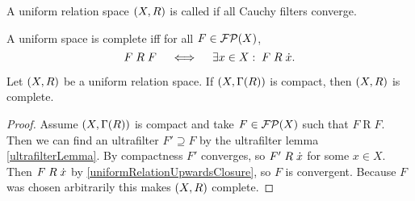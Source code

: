 \begin{definition}
A uniform relation space $\sSet{X,R}$ is called  if all Cauchy filters converge.
\end{definition}

A uniform space is complete iff for all $F\in\operatorname{\mathcal{FP}}(X)$,
\[ F\mathrel{R}F \quad\iff\quad \exists x\in X:\; F\mathrel{R}\dot{x}. \]

\begin{proposition} \label{compactImpliesComplete}
Let $\sSet{X,R}$ be a uniform relation space. If $\sSet{X,\Gamma(R)}$ is compact, then $\sSet{X,R}$ is complete.
\end{proposition}
\begin{proof}
Assume $\sSet{X,\Gamma(R)}$ is compact and take $F\in\operatorname{\mathcal{FP}}(X)$ such that $F\mathrel{R}F$. Then we can find an ultrafilter $F'\supseteq F$ by the ultrafilter lemma \ref{ultrafilterLemma}. By compactness $F'$ converges, so $F'\mathrel{R}\dot{x}$ for some $x\in X$. Then $F \mathrel{R}\dot{x}$ by \ref{uniformRelationUpwardsClosure}, so $F$ is convergent. Because $F$ was chosen arbitrarily this makes $\sSet{X,R}$ complete.
\end{proof}

